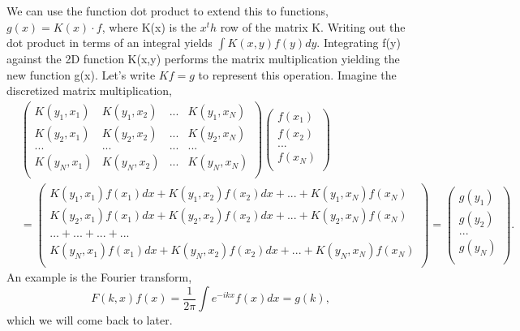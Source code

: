 \documentclass[12pt]{article}
\begin{document}
We can use the function dot product to extend this to functions, $g(x) = K(x) \cdot f$, where K(x) is the $x^th$ row of the matrix K. Writing out the dot product in terms of an integral yields $\int K(x,y)f(y)dy$. Integrating f(y) against the 2D function K(x,y) performs the matrix multiplication yielding the new function g(x). Let's write $Kf = g$ to represent this operation. Imagine the discretized matrix multiplication,
\begin{equation}
\begin{split}
&\begin{pmatrix}
K(y_1,x_1) & K(y_1, x_2) & ... & K(y_1, x_N) \\
K(y_2,x_1) & K(y_2, x_2) & ... & K(y_2, x_N) \\
... & ... & ... & ... \\
K(y_N,x_1) & K(y_N, x_2) & ... & K(y_N, x_N) \\
\end{pmatrix}
\begin{pmatrix}
f(x_1) \\
f(x_2) \\
... \\ 
f(x_N) \\
\end{pmatrix} \\
&=
\begin{pmatrix}
K(y_1,x_1)f(x_1)dx + K(y_1, x_2)f(x_2)dx + ... + K(y_1, x_N)f(x_N) \\
K(y_2,x_1)f(x_1)dx + K(y_2, x_2)f(x_2)dx + ... + K(y_2, x_N)f(x_N) \\
... + ... + ... + ... \\
K(y_N,x_1)f(x_1)dx + K(y_N, x_2)f(x_2)dx + ... + K(y_N, x_N)f(x_N) \\
\end{pmatrix}
=
\begin{pmatrix}
g(y_1) \\
g(y_2) \\
...    \\
g(y_N) \\
\end{pmatrix}.
\end{split}
\end{equation}
An example is the Fourier transform,
\begin{equation}
F(k,x)f(x) = \frac{1}{2\pi}\int e^{-ikx}f(x)dx = g(k), 
\end{equation} 
which we will come back to later.

\end{document}
